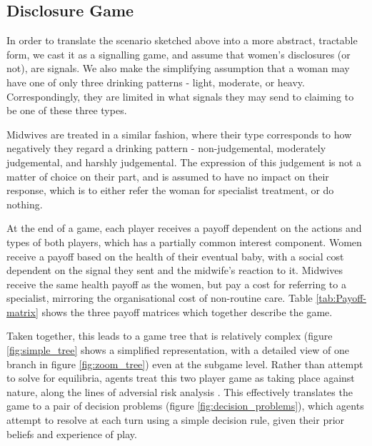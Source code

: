 \subsection{Disclosure Game}
\label{sub:the_game}

In order to translate the scenario sketched above into a more abstract, tractable form, we cast it as a signalling game, and assume that women's disclosures (or not), are signals. We also make the simplifying assumption that a woman may have one of only three drinking patterns - light, moderate, or heavy. Correspondingly, they are limited in what signals they may send to claiming to be one of these three types.

Midwives are treated in a similar fashion, where their type corresponds to how negatively they regard a drinking pattern - non-judgemental, moderately judgemental, and harshly judgemental. The expression of this judgement is not a matter of choice on their part, and is assumed to have no impact on their response, which is to either refer the woman for specialist treatment, or do nothing.

At the end of a game, each player receives a payoff dependent on the actions and types of both players, which has a partially common interest component. Women receive a payoff based on the health of their eventual baby, with a social cost dependent on the signal they sent and the midwife's reaction to it. Midwives receive the same health payoff as the women, but pay a cost for referring to a specialist, mirroring the organisational cost of non-routine care. Table \ref{tab:Payoff-matrix} shows the three payoff matrices which together describe the game.

Taken together, this leads to a game tree that is relatively complex (figure \ref{fig:simple_tree} shows a simplified representation, with a detailed view of one branch in figure \ref{fig:zoom_tree}) even at the subgame level. Rather than attempt to solve for equilibria, agents treat this two player game as taking place against nature, along the lines of adversial risk analysis \citep{RiosInsua2009}. This effectively translates the game to a pair of decision problems (figure \ref{fig:decision_problems}), which agents attempt to resolve at each turn using a simple decision rule, given their prior beliefs and experience of play.

